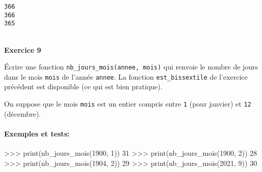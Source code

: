 \documentclass[a4paper,17pt]{extarticle}
\newenvironment{eleve}%
{\begin{activite}\color{noiramu}\\[-0.5cm]}
{\end{activite}}
\newenvironment{Shaded}{}{}
\newcommand{\DecValTok}[1]{\textcolor[rgb]{0.25,0.63,0.44}{{#1}}}
\newcommand{\NormalTok}[1]{{#1}}
\newcommand{\OperatorTok}[1]{\textcolor[rgb]{0.40,0.40,0.40}{{#1}}}
\newcommand{\BuiltInTok}[1]{{#1}}
\begin{document}
    \begin{Verbatim}[commandchars=\\\{\}]
366
366
365
    \end{Verbatim}
\begin{eleve}
    \textbf{Exercice 9}

Écrire une fonction \texttt{nb\_jours\_mois(annee,\ mois)} qui renvoie
le nombre de jours dans le mois \texttt{mois} de l'année \texttt{annee}.
La fonction \texttt{est\_bissextile} de l'exercice précédent est
disponible (ce qui est bien pratique).

On suppose que le mois \texttt{mois} est un entier compris entre
\texttt{1} (pour janvier) et \texttt{12} (décembre).

\hypertarget{exemples-et-tests}{%
\paragraph{Exemples et tests:}\label{exemples-et-tests}}

\begin{Shaded}
\begin{Highlighting}[]
\OperatorTok{\textgreater{}\textgreater{}\textgreater{}} \BuiltInTok{print}\NormalTok{(nb\_jours\_mois(}\DecValTok{1900}\NormalTok{, }\DecValTok{1}\NormalTok{))}
\DecValTok{31}
\OperatorTok{\textgreater{}\textgreater{}\textgreater{}} \BuiltInTok{print}\NormalTok{(nb\_jours\_mois(}\DecValTok{1900}\NormalTok{, }\DecValTok{2}\NormalTok{))}
\DecValTok{28}
\OperatorTok{\textgreater{}\textgreater{}\textgreater{}} \BuiltInTok{print}\NormalTok{(nb\_jours\_mois(}\DecValTok{1904}\NormalTok{, }\DecValTok{2}\NormalTok{))}
\DecValTok{29}
\OperatorTok{\textgreater{}\textgreater{}\textgreater{}} \BuiltInTok{print}\NormalTok{(nb\_jours\_mois(}\DecValTok{2021}\NormalTok{, }\DecValTok{9}\NormalTok{))}
\DecValTok{30}
\end{Highlighting}
\end{Shaded}
        
        \end{eleve}
\end{document}
